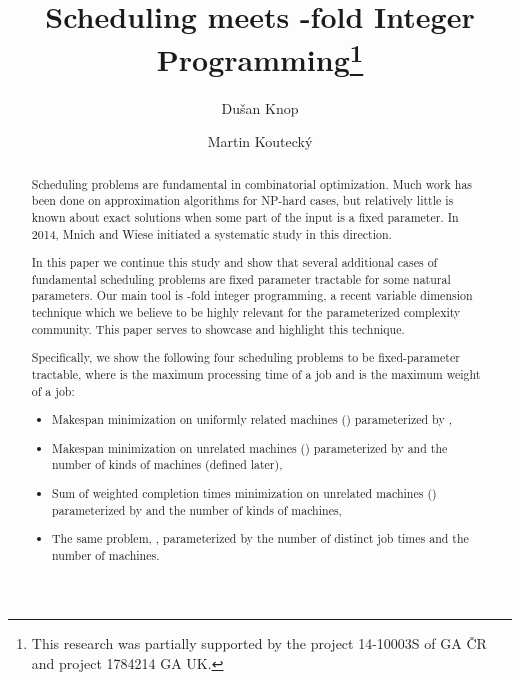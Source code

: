 \documentclass{llncs}
\newcommand{\NP}{{\sf NP}\xspace}
\begin{document}
\title{Scheduling meets -fold Integer Programming\thanks{This research
was partially supported by the project 14-10003S of GA \v{C}R and project 1784214 GA UK.}}





\author{Dušan Knop  \and Martin Koutecký
}




\maketitle

\begin{abstract}
Scheduling problems are fundamental in combinatorial optimization. Much work has been done on approximation algorithms for \NP-hard cases, but relatively little is known about exact solutions when some part of the input is a fixed parameter. In 2014, Mnich and Wiese initiated a systematic study in this direction.

In this paper we continue this study and show that several additional cases of fundamental scheduling problems are fixed parameter tractable for some natural parameters. Our main tool is -fold integer programming, a recent variable dimension technique which we believe to be highly relevant for the parameterized complexity community. This paper serves to showcase and highlight this technique.

Specifically, we show the following four scheduling problems to be fixed-parameter tractable, where  is the maximum processing time of a job and  is the maximum weight of a job:
\begin{itemize}
\item Makespan minimization on uniformly related machines () parameterized by ,
\item Makespan minimization on unrelated machines () parameterized by  and the number of kinds of machines (defined later),
\item Sum of weighted completion times minimization on unrelated machines () parameterized by  and the number of kinds of machines,
\item The same problem, , parameterized by the number of distinct job times and the number of machines.
\end{itemize}



\end{abstract}
\end{document}
